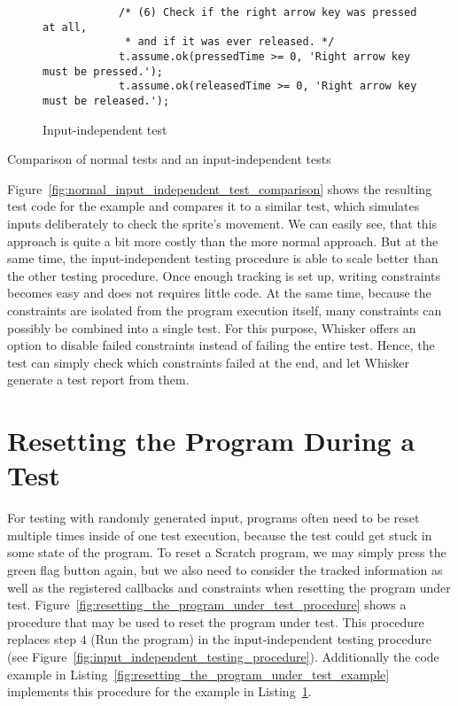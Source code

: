 \begin{listing}[htpb]
\begin{subfigure}[b]{.55\textwidth}
\begin{verbatim}
            /* (6) Check if the right arrow key was pressed at all,
             * and if it was ever released. */
            t.assume.ok(pressedTime >= 0, 'Right arrow key must be pressed.');
            t.assume.ok(releasedTime >= 0, 'Right arrow key must be released.');
        \end{verbatim}
        \caption{Input-independent test}
        \label{fig:normal_input_independent_test_comparison_constraint}
    \end{subfigure}
    \caption{Comparison of normal tests and an input-independent tests}
    \label{fig:normal_input_independent_test_comparison}
\end{listing}
\parspace

Figure~\ref{fig:normal_input_independent_test_comparison} shows the resulting test code for the example
and compares it to a similar test, which simulates inputs deliberately to check the sprite's movement.
We can easily see, that this approach is quite a bit more costly than the more normal approach.
But at the same time, the input-independent testing procedure is able to scale better than the other testing procedure.
Once enough tracking is set up, writing constraints becomes easy and does not requires little code.
At the same time, because the constraints are isolated from the program execution itself,
many constraints can possibly be combined into a single test.
For this purpose, Whisker offers an option to disable failed constraints instead of failing the entire test.
Hence, the test can simply check which constraints failed at the end, and let Whisker generate a test report from them.

\section{Resetting the Program During a Test}
\label{sec:resetting_the_program_during_a_test}

For testing with randomly generated input, programs often need to be reset multiple times inside of one test execution,
because the test could get stuck in some state of the program.
To reset a Scratch program, we may simply press the green flag button again,
but we also need to consider the tracked information as well as the registered callbacks and constraints when resetting the program under test.
Figure~\ref{fig:resetting_the_program_under_test_procedure} shows a procedure that may be used to reset the program under test.
This procedure replaces step $4$ (Run the program) in the input-independent testing procedure (see Figure~\ref{fig:input_independent_testing_procedure}).
Additionally the code example in Listing~\ref{fig:resetting_the_program_under_test_example}
implements this procedure for the example in Listing~\ref{fig:normal_input_independent_test_comparison_constraint}.
\parspace

